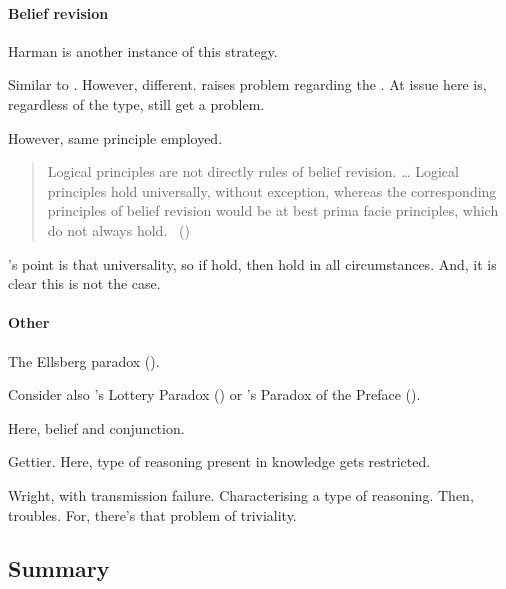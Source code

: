 \paragraph{Belief revision}

\begin{note}
  {
    \color{red}
    Harman is another instance of this strategy.
  }

  Similar to \citeauthor{Harman:1984aa,Harman:1986ux}.
  However, different.
  \citeauthor{Harman:1986ux} raises problem regarding the \tor{}.
  At issue here is, regardless of the type, still get a problem.

  However, same principle employed.

  \begin{quote}
    Logical principles are not directly rules of belief revision.
    \dots
    Logical principles hold universally, without exception, whereas the corresponding principles of belief revision would be at best prima facie principles, which do not always hold.%
    \mbox{ }\hfill\mbox{(\citeyear[107--108]{Harman:1984aa})}
  \end{quote}
  \citeauthor{Harman:1984aa}'s point is that universality, so if hold, then hold in all circumstances.
  And, it is clear this is not the case.
\end{note}

\paragraph{Other}

\begin{note}
  The Ellsberg paradox (\cite{Ellsberg:1961aa}).

  Consider also \citeauthor{Kyburg:1997aa}'s Lottery Paradox (\citeyear{Kyburg:1997aa}) or \citeauthor{Makinson:1965aa}'s Paradox of the Preface (\citeyear{Makinson:1965aa}).

  Here, belief and conjunction.

  Gettier.
  Here, type of reasoning present in knowledge gets restricted.

  Wright, with transmission failure.
  Characterising a type of reasoning.
  Then, troubles.
  For, there's that problem of triviality.
\end{note}

\subsection{Summary}

